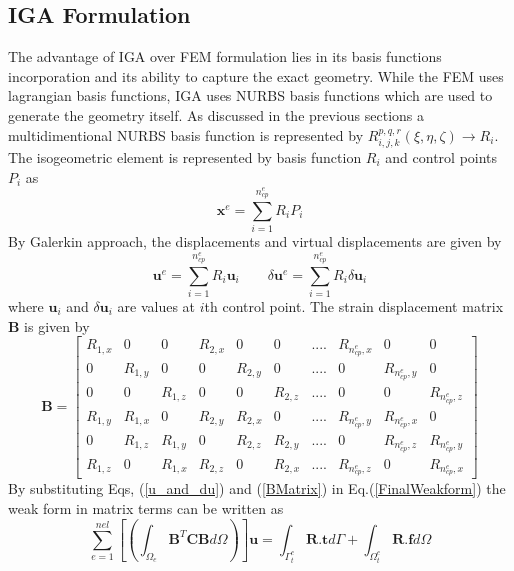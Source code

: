 \documentclass[12pt]{article}
\begin{document}
\subsection{IGA Formulation}
The advantage of IGA over FEM formulation lies in its basis functions incorporation and its ability to capture the exact geometry. While the FEM uses lagrangian basis functions, IGA uses NURBS basis functions which are used to generate the geometry itself. As discussed in the previous sections a multidimentional NURBS basis function is represented by $R_{i,j,k}^{p,q,r}(\xi,\eta,\zeta) \rightarrow R_i$. The isogeometric element  is represented by basis function $R_i$ and control points $P_i$ as
\begin{equation}
\textbf{x}^e = \sum_{i=1}^{n_{cp}^e} R_i P_i
\end{equation} 
By Galerkin approach, the displacements and virtual displacements are given by
\begin{equation} \label{u_and_du}
\textbf{u}^e = \sum_{i=1}^{n_{cp}^e} R_i \textbf{u}_i \qquad \delta\textbf{u}^e = \sum_{i=1}^{n_{cp}^e} R_i \delta\textbf{u}_i
\end{equation}
where $\textbf{u}_i$ and $\delta\textbf{u}_i$ are values at $i$th control point.
The strain displacement matrix \textbf{B} is given by
\begin{equation} \label{BMatrix}
\textbf{B} =
\begin{bmatrix}
R_{1,x} & 0 & 0 & R_{2,x} & 0 & 0 & .... & R_{n_{cp}^e,x} & 0 & 0 \\
0 &R_{1,y} & 0 & 0 & R_{2,y} & 0 & .... & 0 & R_{n_{cp}^e,y} & 0  \\
0 & 0 & R_{1,z} &0 & 0 & R_{2,z} & .... &0 & 0 & R_{n_{cp}^e,z}  \\
R_{1,y} & R_{1,x} & 0 & R_{2,y} & R_{2,x} & 0 & .... & R_{n_{cp}^e,y} & R_{n_{cp}^e,x} & 0 \\
0 & R_{1,z} & R_{1,y} & 0 & R_{2,z} & R_{2,y} & .... & 0 & R_{n_{cp}^e,z} & R_{n_{cp}^e,y}\\
R_{1,z} &0 & R_{1,x} & R_{2,z} &0 & R_{2,x} & .... &R_{n_{cp}^e,z} &0 &R_{n_{cp}^e,x}
\end{bmatrix}
\end{equation}
By substituting Eqs, (\ref{u_and_du}) and (\ref{BMatrix}) in Eq.(\ref{FinalWeakform}) the weak form in matrix terms can be written as
\begin{equation} \label{MatrixWeakForm}
\sum_{e=1}^{nel} \left[ \left( \int_{\Omega_e} \textbf{B}^T \textbf{C} \textbf{B} d\Omega \right) \right] \textbf{u} = \int_{\Gamma^e_t} \textbf{R}.\textbf{t} d\Gamma + \int_{\Omega^e_t} \textbf{R}.\textbf{f} d\Omega 
\end{equation}
\end{document}
